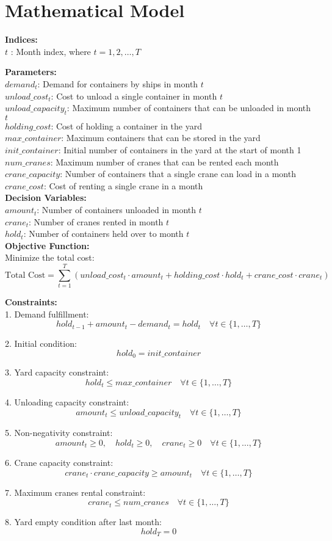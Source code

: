 \documentclass{article}
\begin{document}
\section*{Mathematical Model}

\textbf{Indices:} \\
$t$ : Month index, where $t = 1, 2, \ldots, T$

\textbf{Parameters:} \\
$demand_t$: Demand for containers by ships in month $t$ \\
$unload\_cost_t$: Cost to unload a single container in month $t$ \\
$unload\_capacity_t$: Maximum number of containers that can be unloaded in month $t$ \\
$holding\_cost$: Cost of holding a container in the yard \\
$max\_container$: Maximum containers that can be stored in the yard \\
$init\_container$: Initial number of containers in the yard at the start of month 1 \\
$num\_cranes$: Maximum number of cranes that can be rented each month \\
$crane\_capacity$: Number of containers that a single crane can load in a month \\
$crane\_cost$: Cost of renting a single crane in a month \\

\textbf{Decision Variables:} \\
$amount_t$: Number of containers unloaded in month $t$ \\
$crane_t$: Number of cranes rented in month $t$ \\
$hold_t$: Number of containers held over to month $t$ \\

\textbf{Objective Function:} \\
Minimize the total cost:
\[
\text{Total Cost} = \sum_{t=1}^{T} (unload\_cost_t \cdot amount_t + holding\_cost \cdot hold_t + crane\_cost \cdot crane_t)
\]

\textbf{Constraints:} \\

1. Demand fulfillment:
\[
hold_{t-1} + amount_t - demand_t = hold_t \quad \forall t \in \{1, \ldots, T\}
\]

2. Initial condition:
\[
hold_0 = init\_container
\]

3. Yard capacity constraint:
\[
hold_t \leq max\_container \quad \forall t \in \{1, \ldots, T\}
\]

4. Unloading capacity constraint:
\[
amount_t \leq unload\_capacity_t \quad \forall t \in \{1, \ldots, T\}
\]

5. Non-negativity constraint:
\[
amount_t \geq 0, \quad hold_t \geq 0, \quad crane_t \geq 0 \quad \forall t \in \{1, \ldots, T\}
\]

6. Crane capacity constraint:
\[
crane_t \cdot crane\_capacity \geq amount_t \quad \forall t \in \{1, \ldots, T\}
\]

7. Maximum cranes rental constraint:
\[
crane_t \leq num\_cranes \quad \forall t \in \{1, \ldots, T\}
\]

8. Yard empty condition after last month:
\[
hold_T = 0
\]
\end{document}
